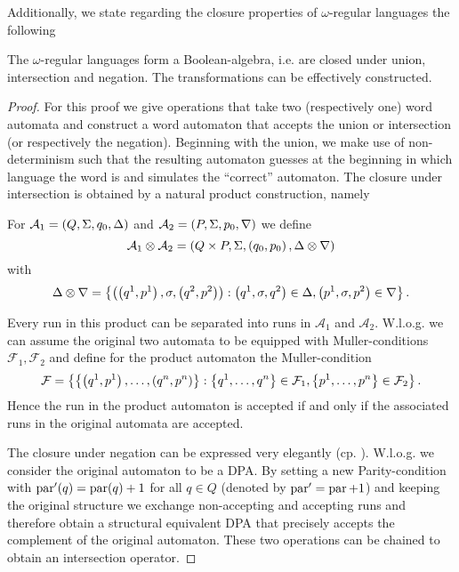 Additionally, we state regarding the closure properties of $\omega$-regular
languages the following
\begin{theorem}
  \cite[Consequence from Theorem 1.5 and Theorem 1.24]{AutoLogInfGames}
  The $\omega$-regular languages form a Boolean-algebra, i.e. are closed under
  union, intersection and negation. The transformations can be effectively
  constructed.
  \label{thm:omegaregboolean}
\end{theorem}
\begin{proof}
  For this proof we give operations that take two (respectively one) word
  automata and construct a word automaton that accepts the union or
  intersection (or respectively the negation). Beginning with the union, we
  make use of non-determinism such that the resulting automaton guesses at the
  beginning in which language the word is and simulates the \enquote{correct}
  automaton. The closure under intersection is obtained by a natural product
  construction, namely
  \begin{definition}
    For $\mathcal{A}_{1} = \left(Q, \Sigma, q_{0}, \Delta\right)$ and
    $\mathcal{A}_{2} = \left(P, \Sigma, p_{0}, \nabla\right)$ we define
    \begin{equation*}
      \mathcal{A}_{1}\otimes\mathcal{A}_{2} = \left(Q\times P, \Sigma, 
      \left(q_{0}, p_{0}\right), \Delta\otimes\nabla\right)
    \end{equation*}
    with
    \begin{equation*}
      \Delta\otimes\nabla = 
      \left\{\left(\left(q^{1}, p^{1}\right), \sigma, 
      \left(q^{2}, p^{2}\right)\right): \left(q^{1},\sigma, q^{2}\right)\in\Delta, 
      \left(p^{1},\sigma, p^{2}\right)\in\nabla\right\}.
    \end{equation*}
  \end{definition}
  Every run in this product can be separated into runs in $\mathcal{A}_{1}$ and
  $\mathcal{A}_{2}$. W.l.o.g. we can assume the original two automata to be
  equipped with Muller-conditions $\mathcal{F}_{1},\mathcal{F}_{2}$ and define
  for the product automaton the Muller-condition 
  \begin{equation*}
    \mathcal{F} = \left\{\left\{\left(q^{1}, p^{1}\right),\dots,\left(q^{n}, p^{n}\right)\right\}:
    \left\{q^{1},\dots,q^{n}\right\}\in\mathcal{F}_{1},
    \left\{p^{1},\dots,p^{n}\right\}\in\mathcal{F}_{2}\right\}.
  \end{equation*}
  Hence the run in the product automaton is accepted if and only if the
  associated runs in the original automata are accepted.

  The closure under negation can be expressed very elegantly (cp.
  \cite[Transformation 1.25.]{AutoLogInfGames}). W.l.o.g. we consider the
  original automaton to be a \ac{DPA}. By setting a new Parity-condition with
  $\operatorname{par}'(q) = \operatorname{par}(q) + 1$ for all $q\in Q$ (denoted by
  $\operatorname{par}' = \operatorname{par} + 1$) and keeping the original structure we exchange
  non-accepting and accepting runs and therefore obtain a structural equivalent
  \ac{DPA} that precisely accepts the complement of the original automaton.
  These two operations can be chained to obtain an intersection operator.
\end{proof}

